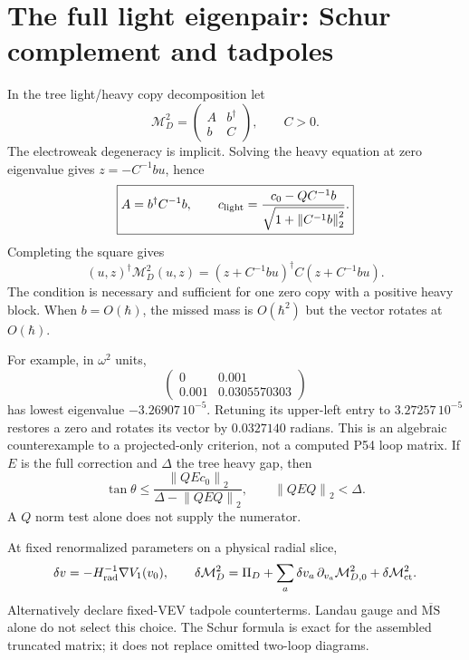 \documentclass[11pt]{article}
\newcommand{\norm}[1]{\left\lVert#1\right\rVert_2}
\newcommand{\MS}{\overline{\mathrm{MS}}}
\begin{document}
\section{The full light eigenpair: Schur complement and tadpoles}
In the tree light/heavy copy decomposition let
\[
\mathcal M_D^2=\begin{pmatrix}A&b^\dagger\\b&C\end{pmatrix},\qquad C>0.
\]
The electroweak degeneracy is implicit. Solving the heavy equation at
zero eigenvalue gives $z=-C^{-1}bu$, hence
\begin{equation}
\boxed{A=b^\dagger C^{-1}b,\qquad
c_{\rm light}=\frac{c_0-QC^{-1}b}
{\sqrt{1+\norm{C^{-1}b}^2}}.}
\label{eq:schur}
\end{equation}
Completing the square gives
\[
(u,z)^\dagger\mathcal M_D^2(u,z)
=(z+C^{-1}bu)^\dagger C(z+C^{-1}bu).
\]
The condition is necessary and sufficient for one zero copy with a
positive heavy block. When $b=O(\hbar)$, the missed mass is
$O(\hbar^2)$ but the vector rotates at $O(\hbar)$.

For example, in $\omega^2$ units,
\[
\begin{pmatrix}0&0.001\\0.001&0.0305570303\end{pmatrix}
\]
has lowest eigenvalue $-3.26907\,10^{-5}$. Retuning its upper-left
entry to $3.27257\,10^{-5}$ restores a zero and rotates its vector
by $0.0327140$ radians. This is an algebraic counterexample to a
projected-only criterion, not a computed P54 loop matrix.
If $E$ is the full correction and $\Delta$ the tree heavy gap, then
\begin{equation}
\tan\theta\le
\frac{\norm{QEc_0}}{\Delta-\norm{QEQ}},\qquad \norm{QEQ}<\Delta.
\label{eq:rotation}
\end{equation}
A $Q$ norm test alone does not supply the numerator.

At fixed renormalized parameters on a physical radial slice,
\begin{equation}
\delta v=-H_{\rm rad}^{-1}\nabla V_1(v_0),\qquad
\delta\mathcal M_D^2=\Pi_D+
\sum_a\delta v_a\,\partial_{v_a}\mathcal M_{D,0}^2+
\delta\mathcal M_{\rm ct}^2.
\end{equation}
Alternatively declare fixed-VEV tadpole counterterms.
Landau gauge and $\MS$ alone do not select this choice.
The Schur formula is exact for the assembled truncated matrix; it
does not replace omitted two-loop diagrams.
\end{document}
